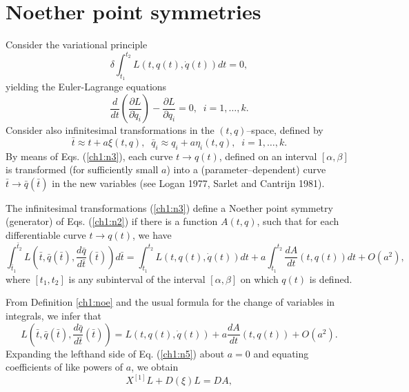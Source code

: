 \section{Noether point symmetries}
Consider the variational principle
\begin{equation}
\label{ch1:n1}
\delta  \int_{t_1}^{t_2} L(t,q(t),\dot q(t))dt=0,
\end{equation}
yielding  the Euler-Lagrange equations
\begin{equation}
\label{ch1:n2}
\frac{d}{dt}\left (\frac{\partial L}{\partial \dot q_i}\right )
-\frac{\partial L}{\partial q_i}=0,\;\;i=1,\ldots ,k.
\end{equation}
Consider also infinitesimal transformations in the $(t,q)$--space, defined
by
\begin{equation}
\label{ch1:n3}
\bar t\approx t+a\xi (t,q),\;\; \bar q_i\approx q_i+a\eta_i (t,q), \;\;i=1,\ldots,k.
\end{equation}
By means of Eqs. (\ref{ch1:n3}), each curve $t\rightarrow q(t)$, defined on an
interval $[\alpha,\beta]$ is transformed (for sufficiently small $a$) into
a (parameter--dependent) curve $\bar t\rightarrow \bar q(\bar t)$ in the new
variables (see Logan 1977, Sarlet and Cantrijn 1981).
\begin{defi}
\begin{em}
\label{ch1:noe}
The infinitesimal transformations (\ref{ch1:n3}) define
a Noether point symmetry (generator) of Eqs. (\ref{ch1:n2}) if there is a
function $A(t,q)$, such  that for
each differentiable curve $t\rightarrow q(t)$, we have
\begin{equation}
\label{ch1:n4}
\int_{\bar t_1}^{\bar t_2} L(\bar t,\bar q(\bar t),\frac{d\bar q}{d\bar t}
(\bar t))d\bar t =\int_{t_1}^{t_2} L(t,q(t),\dot q(t))dt
+  a\int_{t_1}^{t_2} \frac{dA}{dt}(t,q(t))dt + O(a^2),
\end{equation}
where $[t_1,t_2]$ is any subinterval of the interval $[\alpha,\beta]$ on
which $q(t)$ is defined.
\end{em}
\end{defi}
From Definition \ref{ch1:noe} and the usual formula for the
change of variables in integrals, we infer that
\begin{equation}
\label{ch1:n5}
L(\bar t,\bar q(\bar t),\frac{d\bar q}{d\bar t} (\bar t) )
=L(t,q(t),\dot q(t))+ a\frac{dA}{dt}(t,q(t))+ O(a^2).
\end{equation}
Expanding the lefthand side of Eq. (\ref{ch1:n5}) about $a=0$ and equating
coefficients of like powers of $a$, we  obtain
\[ X^{[1]}L+D(\xi)L=DA,\]
